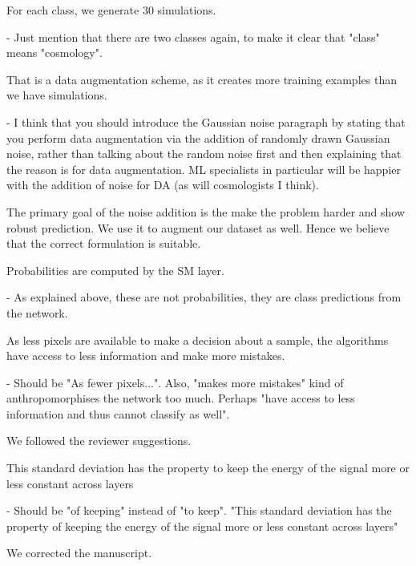 \documentclass[12pt,a4paper]{article}
\newcommand{\nati}[1]{{\color[rgb]{.1,.6,.1}{NP: #1}}}
\newcommand{\todo}[1]{{\color[rgb]{.6,.1,.6}{TODO: #1}}}
\newcommand{\1}{\b{1}}              %
\newcommand{\0}{\b{0}}              %
\begin{document}
\begin{mdframed}[style=comment]
For each class, we generate 30 simulations.

- Just mention that there are two classes again, to make it clear that "class" means "cosmology".
\end{mdframed}
\todo{Assign: @Tomek}

\begin{mdframed}[style=comment]
That is a data augmentation scheme, as it creates more training examples than we have simulations.

- I think that you should introduce the Gaussian noise paragraph by stating that you perform data augmentation via the addition of randomly drawn Gaussian noise, rather than talking about the random noise first and then explaining that the reason is for data augmentation. ML specialists in particular will be happier with the addition of noise for DA (as will cosmologists I think).
\end{mdframed}
\todo{Assign: @all}
\nati{I think that the primary goal of adding noise is the make the problem harder, and show robust prediction, not the make the dataset larger... Hence I disagree with the reviewer. What do you think?}

The primary goal of the noise addition is the make the problem harder and show robust prediction. We use it to augment our dataset as well. Hence we believe that the correct formulation is suitable.

\begin{mdframed}[style=comment]
Probabilities are computed by the SM layer.

- As explained above, these are not probabilities, they are class predictions from the network.
\end{mdframed}
\todo{Assigned @michael}
\nati{Should we simply say "normalized network score"? I do not know...}

\begin{mdframed}[style=comment]
As less pixels are available to make a decision about a sample, the algorithms have access to less information and make more mistakes.

- Should be "As fewer pixels...". Also, "makes more mistakes" kind of anthropomorphises the network too much. Perhaps "have access to less information and thus cannot classify as well".
\end{mdframed}
We followed the reviewer suggestions.

\begin{mdframed}[style=comment]
This standard deviation has the property to keep the energy of the signal more or less constant across layers

- Should be "of keeping" instead of "to keep". "This standard deviation has the property of keeping the energy of the signal more or less constant across layers"
\end{mdframed}
We corrected the manuscript.
\end{document}
